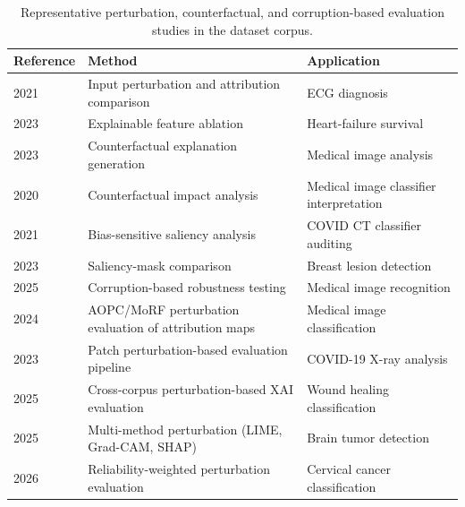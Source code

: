 \setcounter{table}{3}
\begin{table}[H]
\centering
\caption{Representative perturbation, counterfactual, and corruption-based evaluation studies in the dataset corpus.}
\label{tab:perturbation_methods}
\renewcommand{\arraystretch}{1.2}
\begin{tabularx}{\linewidth}{>{\raggedright\arraybackslash}p{2.5cm} >{\raggedright\arraybackslash}X >{\raggedright\arraybackslash}X}
\hline
\textbf{Reference} & \textbf{Method} & \textbf{Application} \\
\hline
\cite{Zhang2021} 2021         & Input perturbation and attribution comparison   & ECG diagnosis \\
\cite{MorenoSanchez2023} 2023 & Explainable feature ablation                    & Heart-failure survival \\
\cite{singla2023explaining} 2023 & Counterfactual explanation generation        & Medical image analysis \\
\cite{lenis2020domain} 2020   & Counterfactual impact analysis                  & Medical image classifier interpretation \\
\cite{palatnik2021xai} 2021   & Bias-sensitive saliency analysis                & COVID CT classifier auditing \\
\cite{Pertuz2023} 2023        & Saliency-mask comparison                        & Breast lesion detection \\
\cite{Repetto2025EvaluatingTR} 2025 & Corruption-based robustness testing       & Medical image recognition \\
\cite{Patricio2024} 2024      & AOPC/MoRF perturbation evaluation of attribution maps & Medical image classification \\
\cite{sun2023improving} 2023  & Patch perturbation-based evaluation pipeline    & COVID-19 X-ray analysis \\
\cite{jacob2025indian} 2025   & Cross-corpus perturbation-based XAI evaluation  & Wound healing classification \\
\cite{akgundougdu2025explainable} 2025 & Multi-method perturbation (LIME, Grad-CAM, SHAP) & Brain tumor detection \\
\cite{alpsalaz2026explainability} 2026 & Reliability-weighted perturbation evaluation & Cervical cancer classification \\
\hline
\end{tabularx}
\end{table}
